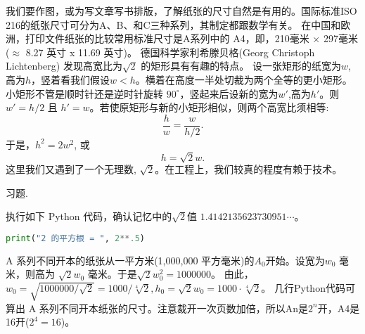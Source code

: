 \documentclass[main.tex]{subfiles}
\begin{document}
我们要作图，或为写文章写书排版，了解纸张的尺寸自然是有用的。国际标准ISO 216的纸张尺寸可分为A、B、和C三种系列，其制定都跟数学有关。
在中国和欧洲，打印文件纸张的比较常用标准尺寸是A系列中的 A4，即，210毫米 × 297毫米 ($\approx$ 8.27 英寸 x 11.69 英寸)。
 德国科学家利希滕贝格(Georg Christoph Lichtenberg) 发现高宽比为$\sqrt{2}$
的矩形具有有趣的特点。
设一张矩形的纸宽为$w$,高为$h$，竖着看我们假设$w <h$。横着在高度一半处切裁为两个全等的更小矩形。小矩形不管是顺时针还是逆时针旋转 $90^\circ$，竖起来后设新的宽为$w'$,高为$h'$。则
$w' = h/2$ 且 $h' = w$。若使原矩形与新的小矩形相似，则两个高宽比须相等:
$$\frac{h}{w} = \frac{w}{h/2}.   $$
于是，$h^2= 2 w^2$, 或
 $$h= \sqrt{2} w.$$
这里我们又遇到了一个无理数, $\sqrt{2}$。在工程上，我们较真的程度有赖于技术。
	
\begin{kaishu}习题.\end{kaishu} 执行如下 Python 代码，确认记忆中的$\sqrt{2}$值 $1.4142135623730951\cdots$。
\begin{spacing}{0.8}
	\begin{small}
	\begin{lstlisting}[language=Python]
print("2 的平方根 = ", 2**.5)
\end{lstlisting}
\end{small}
\end{spacing}

A 系列不同开本的纸张从一平方米(1,000,000 平方毫米)的$A_0$开始。设宽为$w_0$ 毫米，则高为
$\sqrt{2}w_0$ 毫米。于是$\sqrt{2}w_0^2 = 1000000$。
由此，
$w_0 = \sqrt{1000000/\sqrt{2}}=1000/\sqrt[4]{2}, 
h_0=\sqrt{2}w_0=1000\cdot\sqrt[4]{2}$。
几行Python代码可算出 A 系列不同开本纸张的尺寸。注意裁开一次页数加倍，所以An是$2^n$开，A4是16开($2^4=16$)。
\end{document}
